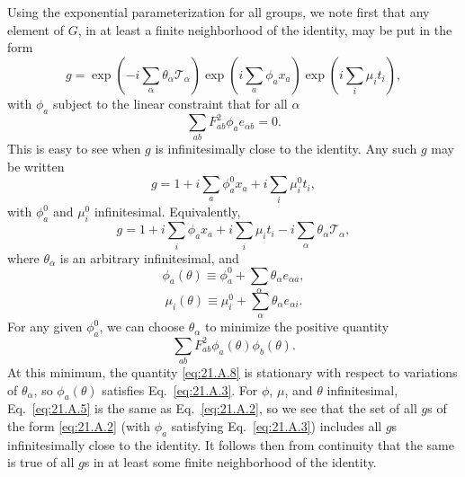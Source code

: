 Using the exponential parameterization for all groups, we note first that
any element of $G$, in at least a finite neighborhood of the identity, may be
put in the form
\begin{equation}
 g=\exp\left(-i\sum_\alpha\theta_\alpha\mathcal T_\alpha\right)
 \exp\left(i\sum_a\phi_a x_a\right)
 \exp\left(i\sum_i\mu_i t_i\right),
 \tag{21.A.2}\label{eq:21.A.2}
\end{equation}
with $\phi_a$ subject to the linear constraint that for all $\alpha$
\begin{equation}
 \sum_{ab}F_{ab}^2\phi_a e_{\alpha b}=0.
 \tag{21.A.3}\label{eq:21.A.3}
\end{equation}
This is easy to see when $g$ is infinitesimally close to the identity. Any such
$g$ may be written
\begin{equation}
 g=1+i\sum_a\phi_a^0x_a+i\sum_i\mu_i^0t_i,
 \tag{21.A.4}\label{eq:21.A.4}
\end{equation}
with $\phi_a^0$ and $\mu_i^0$ infinitesimal. Equivalently,
\begin{equation}
 g=1+i\sum_i\phi_ax_a+i\sum_i\mu_it_i
 -i\sum_\alpha\theta_\alpha\mathcal T_\alpha,
 \tag{21.A.5}\label{eq:21.A.5}
\end{equation}
where $\theta_\alpha$ is an arbitrary infinitesimal, and
\begin{equation}
 \phi_a(\theta)\equiv\phi_a^0+\sum_\alpha\theta_\alpha e_{\alpha a},
 \tag{21.A.6}\label{eq:21.A.6}
\end{equation}
\begin{equation}
 \mu_i(\theta)\equiv\mu_i^0+\sum_\alpha\theta_\alpha e_{\alpha i}.
 \tag{21.A.7}\label{eq:21.A.7}
\end{equation}
For any given $\phi_a^0$, we can choose $\theta_\alpha$ to minimize the positive
quantity
\begin{equation}
 \sum_{ab}F_{ab}^2\phi_a(\theta)\phi_b(\theta).
 \tag{21.A.8}\label{eq:21.A.8}
\end{equation}
At this minimum, the quantity \eqref{eq:21.A.8} is stationary with respect to
variations of $\theta_\alpha$, so $\phi_a(\theta)$ satisfies
Eq.~\eqref{eq:21.A.3}. For $\phi$, $\mu$, and $\theta$ infinitesimal,
Eq.~\eqref{eq:21.A.5} is the same as Eq.~\eqref{eq:21.A.2}, so we see that the
set of all $g$s of the form \eqref{eq:21.A.2} (with $\phi_a$ satisfying
Eq.~\eqref{eq:21.A.3}) includes all $g$s infinitesimally close to the identity.
It follows then from continuity that the same is true of all $g$s in at least
some finite neighborhood of the identity.

